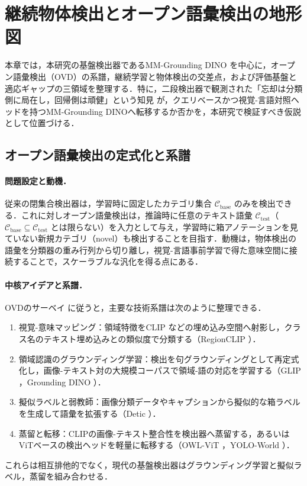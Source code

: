 \section{継続物体検出とオープン語彙検出の地形図}
\label{sec:detection_ovd}

本章では，本研究の基盤検出器であるMM-Grounding DINO \cite{mmgdino} を中心に，オープン語彙検出（OVD）の系譜，継続学習と物体検出の交差点，および評価基盤と適応ギャップの三領域を整理する．特に，二段検出器で観測された「忘却は分類側に局在し，回帰側は頑健」という知見 \cite{nsgp,redistill} が，クエリベースかつ視覚-言語対照ヘッドを持つMM-Grounding DINOへ転移するか否かを，本研究で検証すべき仮説として位置づける．


\subsection{オープン語彙検出の定式化と系譜}
\label{subsec:ovd_lineage}

\paragraph{問題設定と動機．}
従来の閉集合検出器は，学習時に固定したカテゴリ集合 $\mathcal{C}_{\mathrm{base}}$ のみを検出できる．これに対しオープン語彙検出は，推論時に任意のテキスト語彙 $\mathcal{C}_{\mathrm{test}}$（$\mathcal{C}_{\mathrm{base}} \subseteq \mathcal{C}_{\mathrm{test}}$ とは限らない）を入力として与え，学習時に箱アノテーションを見ていない新規カテゴリ（novel）も検出することを目指す．動機は，物体検出の語彙を分類器の重み行列から切り離し，視覚-言語事前学習で得た意味空間に接続することで，スケーラブルな汎化を得る点にある．

\paragraph{中核アイデアと系譜．}
OVDのサーベイ \cite{ovdsurvey} に従うと，主要な技術系譜は次のように整理できる．
\begin{enumerate}
\item 視覚-意味マッピング：領域特徴をCLIP \cite{clip} などの埋め込み空間へ射影し，クラス名のテキスト埋め込みとの類似度で分類する（RegionCLIP \cite{regionclip}）．
\item 領域認識のグラウンディング学習：検出を句グラウンディングとして再定式化し，画像-テキスト対の大規模コーパスで領域-語の対応を学習する（GLIP \cite{glip}，Grounding DINO \cite{groundingdino}）．
\item 擬似ラベルと弱教師：画像分類データやキャプションから擬似的な箱ラベルを生成して語彙を拡張する（Detic \cite{detic}）．
\item 蒸留と転移：CLIPの画像-テキスト整合性を検出器へ蒸留する，あるいはViTベースの検出ヘッドを軽量に転移する（OWL-ViT \cite{owlvit}，YOLO-World \cite{yoloworld}）．
\end{enumerate}
これらは相互排他的でなく，現代の基盤検出器はグラウンディング学習と擬似ラベル，蒸留を組み合わせる．

